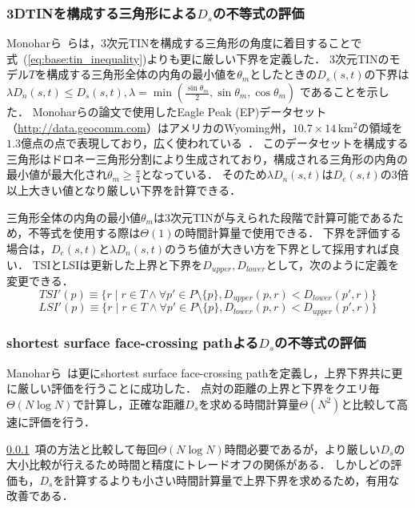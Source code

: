 \documentclass{fit}
\theoremstyle{definition}
\newcommand{\Subsubsec}[1]{#1~項}
\newcommand{\Eq}[1]{式~(#1)}
\begin{document}
\subsubsection{3DTINを構成する三角形による$D_s$の不等式の評価}\label{subsubsec:ineq}
Monoharら~\cite{vldb:manohar2013}らは，3次元TINを構成する三角形の角度に着目することで\Eq{\ref{eq:base:tin_inequality}}よりも更に厳しい下界を定義した．
3次元TINのモデル$T$を構成する三角形全体の内角の最小値を$\theta _m$としたときの$D_s(s,t)$の下界は $\lambda D_n(s,t) \leq D_s(s,t), \lambda = \min(\frac{\sin \theta _m}{2},\sin \theta _m,\cos \theta _m)$ であることを示した．
Monoharらの論文で使用したEagle Peak (EP)データセット（\url{http://data.geocomm.com}）はアメリカのWyoming州，$10.7 \times 14 \, \mathrm{km^2}$の領域を$1.3$億点の点で表現しており，広く使われている~\cite{vldb:deng2008, sigmod:liu2011, vldb:shahabi2008, vldb:xing2009, yan2012monochromatic}．
このデータセットを構成する三角形はドロネー三角形分割により生成されており，構成される三角形の内角の最小値が最大化され$\theta _m \geq \frac{\pi}{4}$となっている．
そのため$\lambda D_n(s,t)$は$D_e(s,t)$の3倍以上大きい値となり厳しい下界を計算できる．

三角形全体の内角の最小値$\theta _m$は3次元TINが与えられた段階で計算可能であるため，不等式を使用する際は$\Theta (1)$の時間計算量で使用できる．
下界を評価する場合は，$D_e(s,t)$と$\lambda D_n(s,t)$のうち値が大きい方を下界として採用すれば良い．
TSIとLSIは更新した上界と下界を$D_{upper},D_{lower}$として，次のように定義を変更できる．
\begin{equation}
    TSI'(p) \equiv \{ r \mid r \in T \wedge \forall p' \in P \setminus \{p\}, D_{upper}(p,r) < D_{lower}(p',r) \}
\end{equation}
\begin{equation}
    LSI'(p) \equiv \{ r \mid r \in T \wedge \forall p' \in P \setminus \{p\}, D_{lower}(p,r) < D_{upper}(p',r) \}
\end{equation}

\subsubsection{shortest surface face-crossing pathよる$D_s$の不等式の評価}
Manoharら~\cite{vldb:manohar2015}は更にshortest surface face-crossing pathを定義し，上界下界共に更に厳しい評価を行うことに成功した．
点対の距離の上界と下界をクエリ毎$\Theta (N\log N)$で計算し，正確な距離$D_s$を求める時間計算量$\Theta (N^2)$と比較して高速に評価を行う．

\Subsubsec{\ref{subsubsec:ineq}}の方法と比較して毎回$\Theta (N\log N)$時間必要であるが，より厳しい$D_s$の大小比較が行えるため時間と精度にトレードオフの関係がある．
しかしどの評価も，$D_s$を計算するよりも小さい時間計算量で上界下界を求めるため，有用な改善である．
\end{document}
